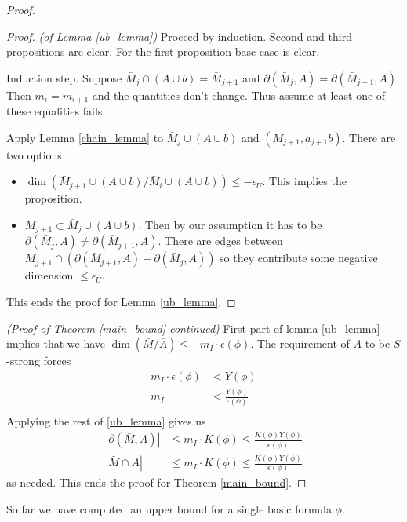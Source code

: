 \begin{proof}
  \begin{proof} \textit{(of Lemma \ref{ub_lemma})}
    Proceed by induction.
    Second and third propositions are clear.
    For the first proposition base case is clear.
    
    Induction step.
    Suppose $\bar M_j \cap (A \cup b) = \bar M_{j+1}$ and $\partial(\bar M_j, A) = \partial(\bar M_{j+1}, A)$.
    Then $m_i = m_{i+1}$ and the quantities don't change.
    Thus assume at least one of these equalities fails.
    
    Apply Lemma \ref{chain_lemma} to $\bar M_j \cup (A \cup b)$ and $(M_{j+1}, a_{j+1}b)$.
    There are two options
    
    \begin{itemize}
    \item $\dim(\bar M_{j+1} \cup (A \cup b) / \bar M_i \cup (A \cup b)) \leq -\epsilon_U$.
      This implies the proposition.
    \item $M_{j+1} \subset \bar M_j \cup (A \cup b)$.
      Then by our assumption it has to be $\partial(\bar M_j, A) \neq \partial(\bar M_{j+1}, A)$.
      There are edges between $M_{j+1} \cap (\partial(\bar M_{j+1}, A) - \partial(\bar M_j, A))$ so they contribute some negative dimension $\leq \epsilon_U$.
    \end{itemize}
    This ends the proof for Lemma \ref{ub_lemma}.
  \end{proof}
  \textit{(Proof of Theorem \ref{main_bound} continued)}
  First part of lemma \ref{ub_lemma} implies that we have $\dim(\bar M / \bar A) \leq -m_I \cdot \epsilon(\phi)$.
  The requirement of $A$ to be $S$-strong forces
  \begin{align*}
    m_I \cdot \epsilon(\phi) &< Y(\phi) \\
    m_I  &< \frac{Y(\phi)}{\epsilon(\phi)} \\
  \end{align*}
  Applying the rest of \ref{ub_lemma} gives us
  \begin{align*}
    |\partial(\bar M, A)| &\leq m_I \cdot K(\phi) \leq \frac{K(\phi)Y(\phi)}{\epsilon(\phi)} \\
    |\bar M \cap A| &\leq m_I \cdot K(\phi) \leq \frac{K(\phi)Y(\phi)}{\epsilon(\phi)}
  \end{align*}
  as needed.
  This ends the proof for Theorem \ref{main_bound}.
\end{proof}

So far we have computed an upper bound for a single basic formula $\phi$.

